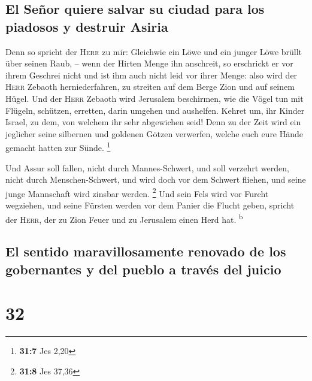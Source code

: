 \hypertarget{el-seuxf1or-quiere-salvar-su-ciudad-para-los-piadosos-y-destruir-asiria}{%
\subsection{El Señor quiere salvar su ciudad para los piadosos y
destruir
Asiria}\label{el-seuxf1or-quiere-salvar-su-ciudad-para-los-piadosos-y-destruir-asiria}}

 Denn so spricht der \textsc{Herr} zu mir: Gleichwie ein
Löwe und ein junger Löwe brüllt über seinen Raub, -- wenn der Hirten
Menge ihn anschreit, so erschrickt er vor ihrem Geschrei nicht und ist
ihm auch nicht leid vor ihrer Menge: also wird der \textsc{Herr} Zebaoth
herniederfahren, zu streiten auf dem Berge Zion und auf seinem Hügel.
 Und der \textsc{Herr} Zebaoth wird Jerusalem beschirmen,
wie die Vögel tun mit Flügeln, schützen, erretten, darin umgehen und
aushelfen.  Kehret um, ihr Kinder Israel, zu dem, von
welchem ihr sehr abgewichen seid!  Denn zu der Zeit wird
ein jeglicher seine silbernen und goldenen Götzen verwerfen, welche euch
eure Hände gemacht hatten zur Sünde. \footnote{\textbf{31:7} Jes 2,20}

 Und Assur soll fallen, nicht durch Mannes-Schwert, und
soll verzehrt werden, nicht durch Menschen-Schwert, und wird doch vor
dem Schwert fliehen, und seine junge Mannschaft wird zinsbar werden.
\footnote{\textbf{31:8} Jes 37,36}  Und sein Fels wird vor
Furcht wegziehen, und seine Fürsten werden vor dem Panier die Flucht
geben, spricht der \textsc{Herr}, der zu Zion Feuer und zu Jerusalem
einen Herd hat. \textsuperscript{b}

\hypertarget{el-sentido-maravillosamente-renovado-de-los-gobernantes-y-del-pueblo-a-travuxe9s-del-juicio}{%
\subsection{El sentido maravillosamente renovado de los gobernantes y
del pueblo a través del
juicio}\label{el-sentido-maravillosamente-renovado-de-los-gobernantes-y-del-pueblo-a-travuxe9s-del-juicio}}

\hypertarget{section-31}{%
\section{32}\label{section-31}}

